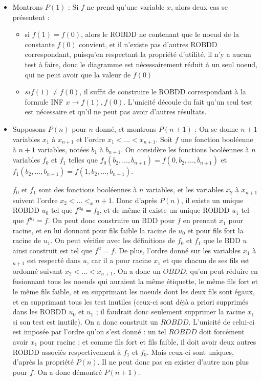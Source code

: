 \documentclass[a4paper,11pt]{article}
\begin{document}
		\begin{itemize}
		\item Montrons $P(1)$ : \newline
		Si $f$ ne prend qu'une variable $x$, alors deux cas se présentent :
			\begin{itemize} 
			\item si $f(1) = f(0)$, alors le ROBDD ne contenant que le noeud de la constante $f(0)$ convient, et il n'existe pas d'autres ROBDD correspondant, puisqu'en respectant la propriété d'utilité, il n'y a aucun test à faire, donc le diagramme est nécessairement réduit à un seul noeud, qui ne peut avoir que la valeur de $f(0)$ \item $si f(1) \neq f(0)$, il suffit de construire le ROBDD correspondant à la formule INF $x \rightarrow f(1),f(0)$. L'unicité découle du fait qu'un seul test est nécessaire et qu'il ne peut pas avoir d'autres résultats.
			\end{itemize}
		\item Supposons $P(n)$ pour $n$ donné, et montrons $P(n+1)$ :
		On se donne $n+1$ variables $x_1$ à $x_{n+1}$ et l'ordre $x_1 < ... < x_{n+1}$.
		Soit $f$ une fonction booléenne à $n+1$ variables, notées $b_1$ à $b_{n+1}$. On considère les fonctions booléennes à $n$ variables $f_0$ et $f_1$ telles que $f_0(b_2,...,b_{n+1}) = f(0,b_2,...,b_{n+1})$ et $f_1(b_2,...,b_{n+1}) = f(1,b_2,...,b_{n+1})$.
		
		$f_0$ et $f_1$ sont des fonctions booléennes à $n$ variables, et  les variables $x_2$ à $x_{n+1}$ suivent l'ordre $x_2 < ... < _ x{n+1}$. Donc d'après $P(n)$, il existe un unique ROBDD $u_0$ tel que $f^{u_0} = f_0$, et de même il existe un unique ROBDD $u_1$ tel que $f^{u_1} = f$.
		On peut donc construire un BDD pour $f$ en prenant $x_1$ pour racine, et en lui donnant pour fils faible la racine de $u_0$ et pour fils fort la racine de $u_1$. On peut vérifier avec les définitions de $f_0$ et $f_1$ que le BDD $u$ ainsi construit est tel que $f^u = f$. De plus, l'ordre donné sur les variables $x_1$ à $_{n+1}$ est respecté dans $u$, car il a pour racine $x_1$ et que chacun de ses fils est ordonné suivant $x_2 < ... < x_{n+1}$. On a donc un $OBDD$, qu'on peut réduire en fusionnant tous les noeuds qui auraient la même étiquette, le même fils fort et le même fils faible, et en supprimant les noeuds dont les deux fils sont égaux, et en supprimant tous les test inutiles (ceux-ci sont déjà a priori supprimés dans les ROBDD $u_0$ et $u_1$ ; il faudrait donc seulement supprimer la racine $x_1$ si son test est inutile). On a donc construit un $ROBDD$. L'unicité de celui-ci est imposée par l'ordre qu'on s'est donné : un tel $ROBDD$ doit forcément avoir $x_1$ pour racine ; et comme fils fort et fils faible, il doit avoir deux autres ROBDD associés respectivement à $f_1$ et $f_0$. Mais ceux-ci sont uniques, d'après la propriété $P(n)$. Il ne peut donc pas en exister d'autre non plus pour $f$. On a donc démontré $P(n+1)$.
		\end{itemize}
		
\end{document}
